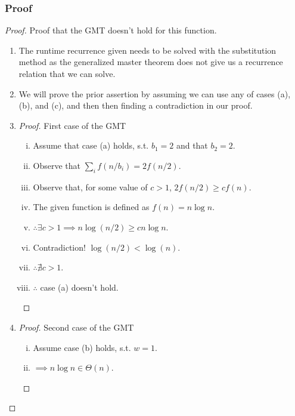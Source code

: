 \documentclass{article}
\begin{document}
\subsubsection{Proof}
\begin{proof} Proof that the GMT doesn't hold for this function.
      \begin{enumerate}
            \item The runtime recurrence given needs to be solved with the substitution method as
                  the generalized master theorem does not give us a recurrence relation
                  that we can solve.
            \item We will prove the prior assertion by assuming we can use any of cases
                  (a), (b), and (c), and then then finding a contradiction in our proof.
            \item  \begin{proof} First case of the GMT
                        \begin{enumerate}[(i)]
                              \item Assume that case (a) holds, s.t. \(b_1 = 2\) and that \(b_2 = 2\).
                              \item Observe that \(\sum_i f(n/b_i) = 2f(n/2)\).
                              \item Observe that, for some value of \(c>1\), \(2f(n/2) \geq cf(n)\).
                              \item The given function is defined as \(f(n) = n \log n \).
                              \item \(\therefore \exists c > 1 \implies n \log (n/2) \geq c n \log n \).
                              \item Contradiction! \(\log (n/2) < \log (n)\).
                              \item \( \therefore \nexists c > 1 \).
                              \item \( \therefore \) case (a) doesn't hold.
                        \end{enumerate}
                  \end{proof}
            \item  \begin{proof} Second case of the GMT
                        \begin{enumerate}[(i)]
                              \item Assume case (b) holds, s.t. \(w=1\).
                              \item \(\implies n \log n  \in \Theta (n)\).

\end{enumerate}
\end{proof}
\end{enumerate}
\end{proof}
\end{document}

